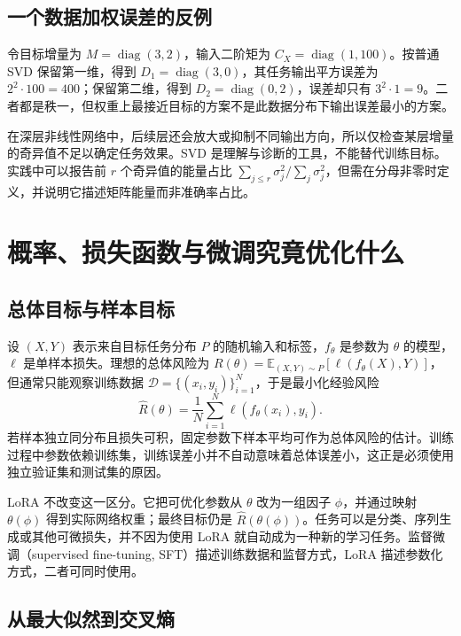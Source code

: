 \documentclass[UTF8,12pt,a4paper,fontset=fandol]{ctexart}
\begin{document}
\subsection{一个数据加权误差的反例}

令目标增量为 $M=\operatorname{diag}(3,2)$，输入二阶矩为
$C_X=\operatorname{diag}(1,100)$。按普通 SVD 保留第一维，得到 $D_1=\operatorname{diag}(3,0)$，其任务输出平方误差为 $2^2\cdot100=400$；保留第二维，得到 $D_2=\operatorname{diag}(0,2)$，误差却只有 $3^2\cdot1=9$。二者都是秩一，但权重上最接近目标的方案不是此数据分布下输出误差最小的方案。

在深层非线性网络中，后续层还会放大或抑制不同输出方向，所以仅检查某层增量的奇异值不足以确定任务效果。SVD 是理解与诊断的工具，不能替代训练目标。实践中可以报告前 $r$ 个奇异值的能量占比
$\sum_{j\leq r}\sigma_j^2/\sum_j\sigma_j^2$，但需在分母非零时定义，并说明它描述矩阵能量而非准确率占比。

\section{概率、损失函数与微调究竟优化什么}
\label{sec:objective}

\subsection{总体目标与样本目标}

设 $(X,Y)$ 表示来自目标任务分布 $P$ 的随机输入和标签，$f_\theta$ 是参数为 $\theta$ 的模型，$\ell$ 是单样本损失。理想的总体风险为
$R(\theta)=\mathbb E_{(X,Y)\sim P}[\ell(f_\theta(X),Y)]$，但通常只能观察训练数据
$\mathcal D=\{(x_i,y_i)\}_{i=1}^N$，于是最小化经验风险
\begin{equation}
\widehat R(\theta)=\frac1N\sum_{i=1}^{N}
\ell(f_\theta(x_i),y_i).
\label{eq:empirical-risk}
\end{equation}
若样本独立同分布且损失可积，固定参数下样本平均可作为总体风险的估计。训练过程中参数依赖训练集，训练误差小并不自动意味着总体误差小，这正是必须使用独立验证集和测试集的原因。

LoRA 不改变这一区分。它把可优化参数从 $\theta$ 改为一组因子 $\phi$，并通过映射 $\theta(\phi)$ 得到实际网络权重；最终目标仍是 $\widehat R(\theta(\phi))$。任务可以是分类、序列生成或其他可微损失，并不因为使用 LoRA 就自动成为一种新的学习任务。监督微调（supervised fine-tuning, SFT）描述训练数据和监督方式，LoRA 描述参数化方式，二者可同时使用。

\subsection{从最大似然到交叉熵}
\end{document}
